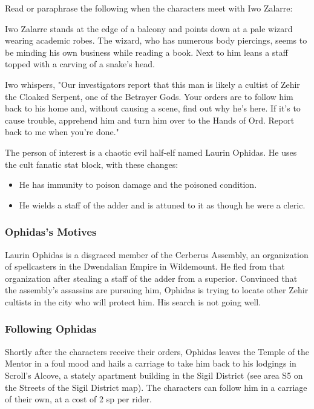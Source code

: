 \documentclass[10pt,a4paper,twoside,bg=print,twocolumn,openany,nodeprecatedcode]{dndbook}
\begin{document}
Read or paraphrase the following when the characters meet with Iwo Zalarre:

\begin{DndReadAloud}{}
Iwo Zalarre stands at the edge of a balcony and points down at a pale wizard wearing academic robes. The wizard, who has numerous body piercings, seems to be minding his own business while reading a book. Next to him leans a staff topped with a carving of a snake's head.

Iwo whispers, "Our investigators report that this man is likely a cultist of Zehir the Cloaked Serpent, one of the Betrayer Gods. Your orders are to follow him back to his home and, without causing a scene, find out why he's here. If it's to cause trouble, apprehend him and turn him over to the Hands of Ord. Report back to me when you're done."

\end{DndReadAloud}

The person of interest is a chaotic evil half-elf named Laurin Ophidas. He uses the cult fanatic stat block, with these changes:


\begin{itemize}
\item He has immunity to poison damage and the poisoned condition.
\item He wields a staff of the adder and is attuned to it as though he were a cleric.
\end{itemize}

\subsubsection{Ophidas's Motives}
Laurin Ophidas is a disgraced member of the Cerberus Assembly, an organization of spellcasters in the Dwendalian Empire in Wildemount. He fled from that organization after stealing a staff of the adder from a superior. Convinced that the assembly's assassins are pursuing him, Ophidas is trying to locate other Zehir cultists in the city who will protect him. His search is not going well.

\subsubsection{Following Ophidas}
Shortly after the characters receive their orders, Ophidas leaves the Temple of the Mentor in a foul mood and hails a carriage to take him back to his lodgings in Scroll's Alcove, a stately apartment building in the Sigil District (see area S5 on the Streets of the Sigil District map). The characters can follow him in a carriage of their own, at a cost of 2 sp per rider.
\end{document}
